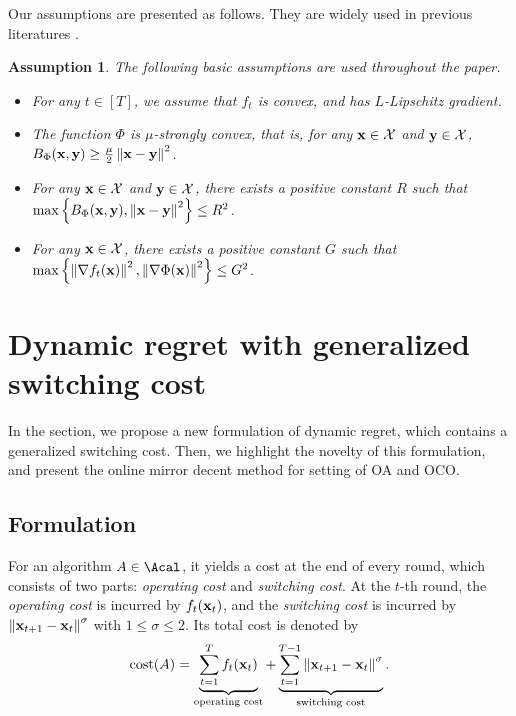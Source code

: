 \documentclass[journal]{IEEEtran}
\newtheorem{Assumption}{\bf{Assumption}}
\begin{document}
Our assumptions are presented as follows. They are widely used in previous literatures \cite{Li:2018uy,pmlr-v75-chen18b,ShalevShwartz:2012dz,Hazan2016Introduction,introduction-online-optimization}.
\begin{Assumption}
\label{assumption_basic}
The following basic assumptions are used throughout the paper.
\begin{itemize}
\item For any $t\in[T]$, we assume that $f_t$ is convex, and has $L$-Lipschitz gradient.
\item The function $\Phi$ is $\mu$-strongly convex, that is, for any ${\bf x}\in{\mathcal{X}}$ and ${\bf y}\in{\mathcal{X}}$,  $ B_{\Phi}({\bf x},{\bf y}) \ge \frac{\mu}{2}\left\lVert{\bf x}-{\bf y}\right\rVert^2 $.
\item For any ${\bf x}\in{\mathcal{X}}$ and ${\bf y}\in{\mathcal{X}}$, there exists a positive constant $R$ such that $\max \left \{ B_\Phi({\bf x}, {\bf y}), \left\lVert{\bf x} - {\bf y}\right\rVert^2 \right \}    \le R^2$.
\item For any ${\bf x}\in{\mathcal{X}}$, there exists a positive constant $G$ such that $\max \left \{ \left\lVert\nabla f_t({\bf x})\right\rVert^2, \left\lVert\nabla \Phi({\bf x})\right\rVert^2 \right \} \le G^2$.
\end{itemize}
 
\end{Assumption}



\section{Dynamic regret with generalized switching cost}
\label{sect_dynamic_regret_switching_cost_our_formulation}
In the section, we propose a new formulation of dynamic regret, which contains a generalized switching cost. Then, we highlight the novelty of this formulation, and present the online mirror decent method for setting of OA and OCO.

\subsection{Formulation}
\label{subsect_formulation}

For an algorithm $A\in \Acal$, it yields a cost at the end of every round, which consists of two parts: \textit{operating cost} and \textit{switching cost}. At the $t$-th round, the \textit{operating cost} is incurred by $f_t({\bf x}_t)$, and the \textit{switching cost} is incurred by $\left\lVert{\bf x}_{t+1} - {\bf x}_t\right\rVert^{\sigma}$ with $1\le \sigma \le 2$. Its total cost is denoted by 
\begin{align}
\nonumber
\text{cost}(A) = \underbrace{\sum_{t=1}^T f_t({\bf x}_t)}_{\text{operating cost}} + \underbrace{\sum_{t=1}^{T-1}\left\lVert{\bf x}_{t+1} - {\bf x}_t\right\rVert^{\sigma}}_{\text{switching cost}}.
\end{align}
\end{document}

